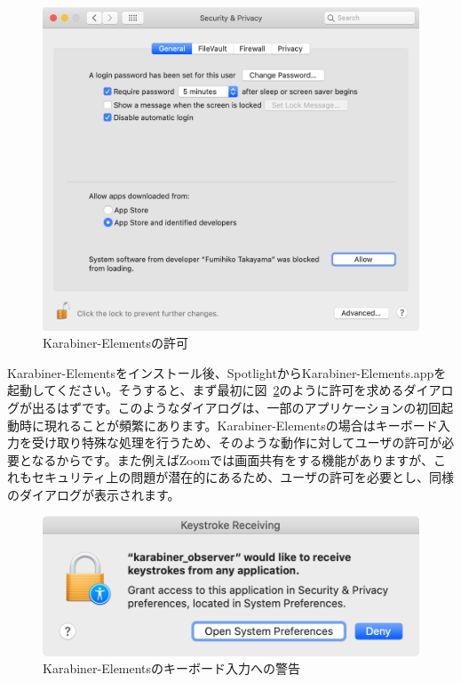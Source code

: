 \begin{figure}
  \centering
  \includegraphics[scale=0.35]{fig/Karabiner_allow.png}
  \caption{Karabiner-Elementsの許可}
  \label{fig:Karabiner_allow}
\end{figure}

Karabiner-Elementsをインストール後、SpotlightからKarabiner-Elements.appを起動してください。そうすると、まず最初に図~\ref{fig:Karabiner_keystroke}のように許可を求めるダイアログが出るはずです。このようなダイアログは、一部のアプリケーションの初回起動時に現れることが頻繁にあります。Karabiner-Elementsの場合はキーボード入力を受け取り特殊な処理を行うため、そのような動作に対してユーザの許可が必要となるからです。また例えばZoomでは画面共有をする機能がありますが、これもセキュリティ上の問題が潜在的にあるため、ユーザの許可を必要とし、同様のダイアログが表示されます。

\begin{figure}
  \centering
  \includegraphics[scale=0.35]{fig/Karabiner_keystroke.png}
  \caption{Karabiner-Elementsのキーボード入力への警告}
  \label{fig:Karabiner_keystroke}
\end{figure}

